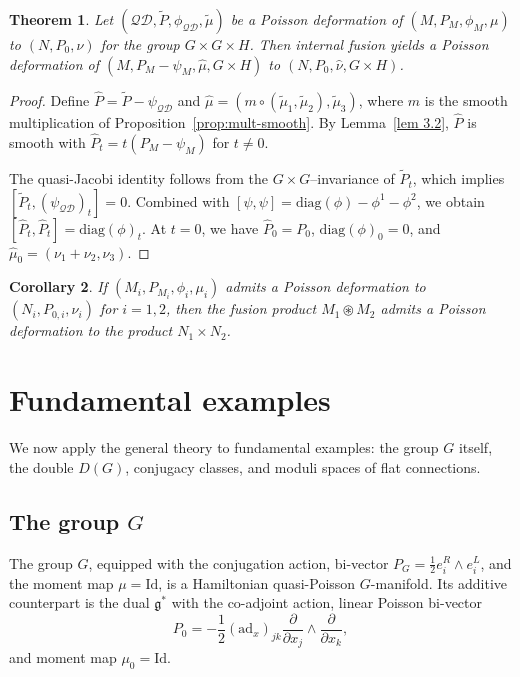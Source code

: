 \documentclass[reqno]{amsart}
\theoremstyle{plain}
\newtheorem{Thm}{Theorem}[section]
\newtheorem{Cor}[Thm]{Corollary}
\theoremstyle{definition}
\begin{document}
\begin{Thm}\label{thm:fusion-compat}
Let $(\mathcal{QD},\tilde{P},\phi_{\mathcal{QD}},\tilde{\mu})$ be a Poisson deformation of $(M,P_{M},\phi_{M},\mu)$ to $(N,P_{0},\nu)$ for the group $G\times G\times H$. Then internal fusion yields a Poisson deformation of $(M,P_{M}-\psi_{M},\widehat{\mu},G\times H)$ to $(N,P_{0},\widehat{\nu},G\times H)$.
\end{Thm}

\begin{proof}
Define $\widehat{P}=\tilde{P}-\psi_{\mathcal{QD}}$ and $\widehat{\mu}=(m\circ(\tilde{\mu}_{1},\tilde{\mu}_{2}),\tilde{\mu}_{3})$, where $m$ is the smooth multiplication of Proposition~\ref{prop:mult-smooth}. By Lemma~\ref{lem 3.2}, $\widehat{P}$ is smooth with $\widehat{P}_{t}=t(P_{M}-\psi_{M})$ for $t\neq 0$.

The quasi-Jacobi identity follows from the $G\times G$--invariance of $\tilde{P}_{t}$, which implies $[\tilde{P}_{t},(\psi_{\mathcal{QD}})_{t}]=0$. Combined with $[\psi,\psi]=\mathrm{diag}(\phi)-\phi^{1}-\phi^{2}$, we obtain $[\widehat{P}_{t},\widehat{P}_{t}]=\mathrm{diag}(\phi)_{t}$. At $t=0$, we have $\widehat{P}_{0}=P_{0}$, $\mathrm{diag}(\phi)_{0}=0$, and $\widehat{\mu}_{0}=(\nu_{1}+\nu_{2},\nu_{3})$.
\end{proof}

\begin{Cor}\label{cor:fusion-product}
If $(M_{i},P_{M_{i}},\phi_{i},\mu_{i})$ admits a Poisson deformation to $(N_{i},P_{0,i},\nu_{i})$ for $i=1,2$, then the fusion product $M_{1}\circledast M_{2}$ admits a Poisson deformation to the product $N_{1}\times N_{2}$.
\end{Cor}


\section{Fundamental examples} \label{sec 4}

We now apply the general theory to fundamental examples: the group $G$ itself, the double $D(G)$, conjugacy classes, and moduli spaces of flat connections.

\subsection{The group $G$} \label{G}

The group $G$, equipped with the conjugation action, bi-vector $P_{G} = \frac{1}{2}e^{R}_{i}\wedge e^{L}_{i}$, and the moment map $\mu = \mathrm{Id}$, is a Hamiltonian quasi-Poisson $G$-manifold. Its additive counterpart is the dual $\mathfrak{g}^{*}$ with the co-adjoint action, linear Poisson bi-vector
\[
P_{0} = -\frac{1}{2}(\mathrm{ad}_{x})_{jk}\frac{\partial}{\partial x_{j}}\wedge \frac{\partial}{\partial x_{k}},
\]
and moment map $\mu_0 = \mathrm{Id}$.
\end{document}
